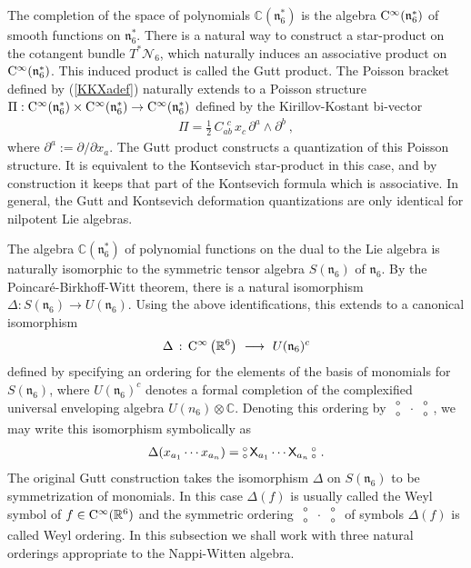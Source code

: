 \documentclass[11pt,a4paper]{article}
\newcommand{\NO}{\mbox{$\substack{\circ\\\circ}$}}      %
\def\CC{{\rm C}}
\def\X{{\sf X}}
\def\mfn{{\mathfrak n}}
\newcommand{\complex}{{\mathbb C}} %
\newcommand{\real}{{\mathbb R}} %
\newcommand{\beq}{\begin{eqnarray}}
\newcommand{\eeq}{\end{eqnarray}}
\begin{document}
The completion of the space of polynomials $\complex(\mfn_6^*)$ is the
algebra ${\rm C}^\infty(\mathfrak{n}_6^*)$ of smooth functions on
$\mathfrak{n}_6^*$. There is a natural way to construct a star-product
  on the cotangent bundle $T^*\mathcal{N}_6$, which naturally induces
  an associative product on ${\rm C}^\infty(\mfn_6^*)$. This induced
  product is called the Gutt product. The Poisson bracket defined by
  (\ref{KKXadef}) naturally extends to a Poisson structure
  $\Pi:\CC^\infty(\mfn_6^*)\times\CC^\infty(\mfn_6^*)\to\CC^\infty(\mfn_6^*)$
  defined by the Kirillov-Kostant bi-vector
\beq
\Pi=\mbox{$\frac12$}\,C_{ab}^{~~c}\,x_c\,\partial^a\wedge\partial^b \
,
\label{KKbivector}\eeq
where $\partial^a:=\partial/\partial x_a$. The Gutt product constructs a
  quantization of this Poisson structure. It is equivalent to the
  Kontsevich star-product in this case, and by construction it keeps
  that part of the Kontsevich formula which is associative. In
  general, the Gutt and Kontsevich deformation quantizations are only
  identical for nilpotent Lie algebras.

The algebra $\complex(\mfn_6^*)$ of polynomial functions on the dual
to the Lie algebra is naturally isomorphic to the symmetric tensor algebra
$S(\mfn_6)$ of $\mfn_6$. By the Poincar\'e-Birkhoff-Witt theorem,
there is a natural isomorphism $\Delta:S(\mfn_6)\to
U(\mfn_6)$. Using the above identifications, this extends to a
canonical isomorphism
\beq
\Delta\,:\,\CC^\infty\left(\real^6\right)~\longrightarrow~U(\mfn_6)^c
\label{Sigmaiso}\eeq
defined by specifying an ordering for the elements of the
basis of monomials for $S(\mfn_6)$, where $U(\mfn_6)^c$ denotes a
formal completion of the complexified universal enveloping algebra
$U(n_6)\otimes\complex$. Denoting this ordering by
$\NO\,\cdot\,\NO$, we may write this isomorphism symbolically as
\beq
\Delta(x_{a_1}\cdots x_{a_n})=\NO\,\X_{a_1}\cdots\X_{a_n}\,\NO \ .
\label{Sigmasymbol}\eeq
The original Gutt construction takes the isomorphism
$\Delta$ on $S(\mfn_6)$ to be symmetrization of monomials. In this
case $\Delta(f)$ is usually called the Weyl symbol of
$f\in\CC^\infty(\real^6)$ and the symmetric ordering $\NO\,\cdot\,\NO$
of symbols $\Delta(f)$ is called Weyl ordering. In this subsection we
shall work with three natural orderings appropriate to the
Nappi-Witten algebra.
\end{document}
